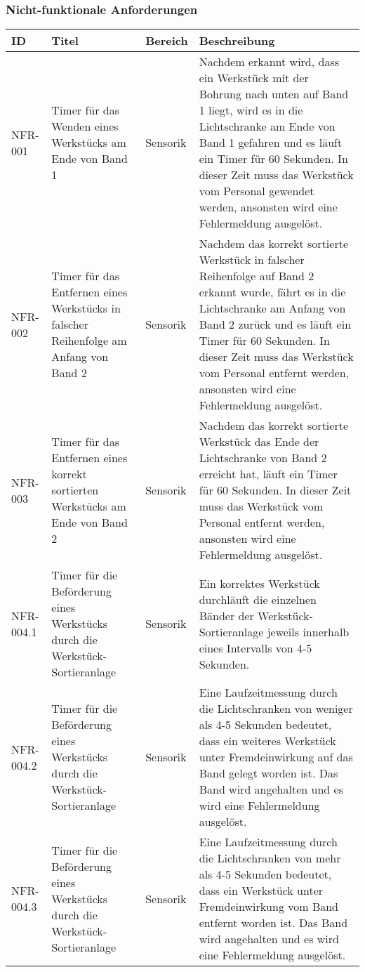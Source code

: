 \documentclass[oneside,a4paper,titlepage]{scrartcl} %
\begin{document}
\subsubsection{Nicht-funktionale Anforderungen}
\begin{small}
 \begin{longtable}{|p{2cm}|p{4cm}|p{1.5cm}|p{5.5cm}|}
  \hline
  \textbf{ID} & \textbf{Titel} & \textbf{Bereich} & \textbf{Beschreibung}\\
  \toprule
  \endhead
  \hline
  NFR-001 & Timer für das Wenden eines Werkstücks am Ende von Band 1 & Sensorik & Nachdem erkannt wird, dass ein Werkstück mit der Bohrung nach unten auf Band 1 liegt, wird es in die Lichtschranke am Ende von Band 1 gefahren und es läuft ein Timer für 60 Sekunden. In dieser Zeit muss das Werkstück vom Personal gewendet werden, ansonsten wird eine Fehlermeldung ausgelöst.\\
  \hline
  \rowcolor{gray} NFR-002 & Timer für das Entfernen eines Werkstücks in falscher Reihenfolge am Anfang von Band 2 &  Sensorik & Nachdem das korrekt sortierte Werkstück in falscher Reihenfolge auf Band 2 erkannt wurde, fährt es in die Lichtschranke am Anfang von Band 2 zurück und es läuft ein Timer für 60 Sekunden. In dieser Zeit muss das Werkstück vom Personal entfernt werden, ansonsten wird eine Fehlermeldung ausgelöst.\\
  \hline
  NFR-003 & Timer für das Entfernen eines korrekt sortierten Werkstücks am Ende von Band 2 & Sensorik & Nachdem das korrekt sortierte Werkstück das Ende der Lichtschranke von Band 2 erreicht hat, läuft ein Timer für 60 Sekunden. In dieser Zeit muss das Werkstück vom Personal entfernt werden, ansonsten wird eine Fehlermeldung ausgelöst.\\
  \hline
  \rowcolor{gray} NFR-004.1 & Timer für die Beförderung eines Werkstücks durch die Werkstück-Sortieranlage & Sensorik & Ein korrektes Werkstück durchläuft die einzelnen Bänder der Werkstück-Sortieranlage jeweils innerhalb eines Intervalls von 4-5 Sekunden.\\
  \hline
  \rowcolor{gray} NFR-004.2 & Timer für die Beförderung eines Werkstücks durch die Werkstück-Sortieranlage & Sensorik & Eine Laufzeitmessung durch die Lichtschranken von weniger als 4-5 Sekunden bedeutet, dass ein weiteres Werkstück unter Fremdeinwirkung auf das Band gelegt worden ist. Das Band wird angehalten und es wird eine Fehlermeldung ausgelöst.\\
  \hline
  \rowcolor{gray} NFR-004.3 & Timer für die Beförderung eines Werkstücks durch die Werkstück-Sortieranlage & Sensorik & Eine Laufzeitmessung durch die Lichtschranken von mehr als 4-5 Sekunden bedeutet, dass ein Werkstück unter Fremdeinwirkung vom Band entfernt worden ist. Das Band wird angehalten und es wird eine Fehlermeldung ausgelöst.\\

\end{longtable}
\end{small}
\end{document}
